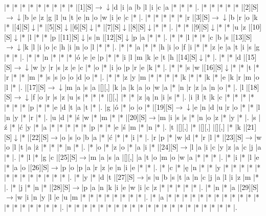 \documentclass[11pt]{article}
\newcommand\drarr{$\rightarrow \!\!\!\!\! \downarrow$}
\newcommand\rarr{$\rightarrow$}
\newcommand\darr{$\downarrow$}
\begin{document}
\noindent\begin{Puzzle}{20}{26}|*	|*	|*	|*	|*	|*	|*	|*	|*	|[1][S]\drarr	|d	|i	|a	|b	|l	|i	|c	|a	|*	|*	|*	|.
|*	|*	|*	|*	|*	|[2][S]\drarr	|b	|e	|z	|g	|l	|u	|t	|e	|n	|o	|w	|i	|e	|c	|*	|.
|*	|*	|*	|*	|*	|r	|[3][S]\drarr	|b	|r	|o	|k	|*	|[4][S]\darr	|*	|[5][S]\darr	|[6][S]\darr	|*	|[7][S]\darr	|[8][S]\darr	|*	|*	|.
|*	|*	|[9][S]\darr	|*	|*	|u	|z	|[10][S]\darr	|*	|l	|*	|*	|p	|[11][S]\darr	|s	|n	|[12][S]\darr	|p	|a	|*	|*	|.
|*	|*	|l	|*	|*	|c	|b	|s	|[13][S]\drarr	|k	|l	|i	|o	|c	|h	|i	|n	|o	|l	|*	|*	|.
|*	|*	|a	|*	|*	|h	|i	|o	|f	|i	|*	|*	|z	|e	|a	|t	|i	|s	|g	|*	|*	|.
|*	|*	|n	|*	|*	|*	|ó	|e	|e	|p	|*	|*	|i	|l	|m	|k	|e	|t	|h	|[14][S]\darr	|*	|.
|*	|*	|d	|[15][S]\drarr	|w	|y	|r	|s	|z	|e	|c	|*	|o	|*	|i	|o	|p	|r	|e	|k	|*	|.
|*	|*	|s	|w	|[16][S]\darr	|*	|*	|t	|*	|r	|*	|*	|m	|*	|s	|s	|o	|o	|d	|o	|*	|.
|*	|*	|z	|y	|m	|*	|*	|*	|*	|k	|*	|*	|k	|*	|e	|k	|r	|m	|o	|l	|*	|.
|[17][S]\drarr	|m	|a	|s	|a	|[][,]{ }	|k	|a	|k	|a	|o	|w	|a	|*	|n	|r	|z	|a	|n	|o	|*	|.
|l	|[18][S]\drarr	|f	|o	|r	|s	|z	|u	|s	|*	|*	|*	|[][,]{ }	|*	|*	|z	|ą	|n	|i	|s	|*	|.
|i	|ł	|t	|k	|c	|*	|*	|*	|*	|*	|*	|*	|p	|*	|*	|e	|d	|t	|a	|t	|*	|.
|g	|ó	|*	|o	|o	|*	|[19][S]\drarr	|e	|n	|d	|u	|r	|o	|*	|*	|l	|n	|y	|*	|r	|*	|.
|u	|d	|*	|ś	|w	|*	|m	|*	|*	|[20][S]\rarr	|m	|i	|s	|s	|*	|n	|o	|z	|*	|y	|*	|.
|s	|ź	|*	|ć	|y	|*	|a	|*	|*	|*	|*	|*	|p	|*	|*	|e	|ś	|m	|*	|n	|*	|.
|t	|[][,]{ }	|*	|[][,]{ }	|[][,]{ }	|*	|k	|[21][S]\darr	|*	|[22][S]\rarr	|o	|s	|o	|b	|a	|*	|ć	|*	|*	|i	|*	|.
|r	|p	|*	|w	|d	|*	|r	|l	|*	|[23][S]\rarr	|w	|o	|l	|t	|a	|ż	|*	|*	|*	|n	|*	|.
|*	|o	|*	|z	|o	|*	|a	|i	|*	|[24][S]\rarr	|l	|a	|i	|c	|y	|z	|a	|c	|j	|a	|*	|.
|*	|l	|*	|g	|c	|[25][S]\rarr	|m	|a	|s	|a	|[][,]{ }	|a	|t	|o	|m	|o	|w	|a	|*	|*	|*	|.
|*	|i	|*	|l	|e	|*	|a	|o	|[26][S]\rarr	|p	|o	|p	|a	|r	|z	|e	|n	|i	|e	|*	|*	|.
|*	|c	|*	|ę	|n	|*	|*	|y	|*	|*	|*	|*	|*	|*	|*	|*	|*	|*	|*	|*	|*	|.
|*	|y	|*	|d	|t	|[27][S]\rarr	|s	|u	|b	|s	|t	|a	|n	|c	|j	|a	|l	|i	|z	|m	|*	|.
|*	|j	|*	|n	|*	|[28][S]\rarr	|p	|a	|n	|k	|i	|e	|w	|i	|c	|z	|*	|*	|*	|*	|*	|.
|*	|n	|*	|a	|[29][S]\rarr	|w	|i	|n	|y	|l	|e	|u	|m	|*	|*	|*	|*	|*	|*	|*	|*	|.
|*	|a	|*	|*	|*	|*	|*	|*	|*	|*	|*	|*	|*	|*	|*	|*	|*	|*	|*	|*	|*	|.
|*	|*	|*	|*	|*	|*	|*	|*	|*	|*	|*	|*	|*	|*	|*	|*	|*	|*	|*	|*	|*	|.\end{Puzzle}

\newpage
\end{document}
